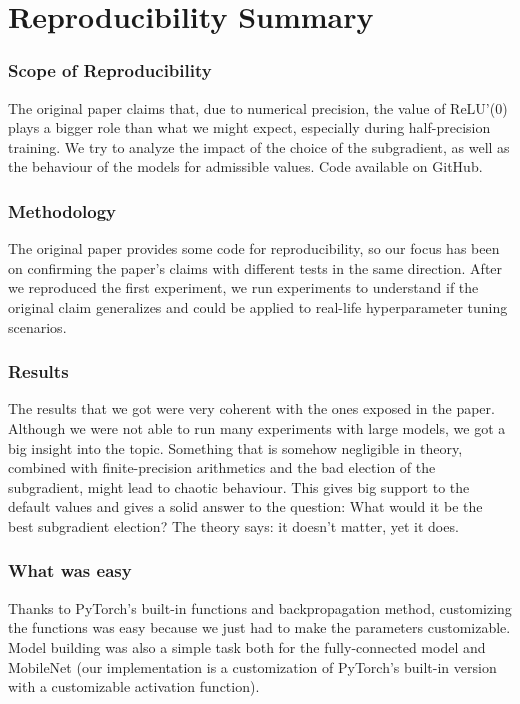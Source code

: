 \section*{\centering Reproducibility Summary}

\subsubsection*{Scope of Reproducibility}

The original paper claims that, due to numerical precision, the value of ReLU'(0) plays a bigger role than what we might expect, especially during half-precision training. We try to analyze the impact of the choice of the subgradient, as well as the behaviour of the models for admissible values. Code available on GitHub.

\subsubsection*{Methodology}

The original paper provides some code for reproducibility, so our focus has been on confirming the paper's claims with different tests in the same direction. After we reproduced the first experiment, we run experiments to understand if the original claim generalizes and could be applied to real-life hyperparameter tuning scenarios.

\subsubsection*{Results}

The results that we got were very coherent with the ones exposed in the paper. Although we were not able to run many experiments with large models, we got a big insight into the topic. Something that is somehow negligible in theory, combined with finite-precision arithmetics and the bad election of the subgradient, might lead to chaotic behaviour. This gives big support to the default values and gives a solid answer to the question: What would it be the best subgradient election?  The theory says: it doesn't matter, yet it does.

\subsubsection*{What was easy}

Thanks to PyTorch's built-in functions and backpropagation method, customizing the functions was easy because we just had to make the parameters customizable. Model building was also a simple task both for the fully-connected model and MobileNet (our implementation is a customization of PyTorch's built-in version with a customizable activation function). 

